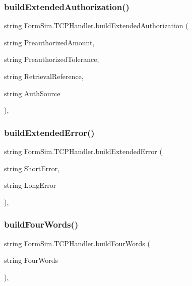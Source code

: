 \subsubsection{\texorpdfstring{build\+Extended\+Authorization()}{buildExtendedAuthorization()}}
{\footnotesize\ttfamily string Form\+Sim.\+T\+C\+P\+Handler.\+build\+Extended\+Authorization (\begin{DoxyParamCaption}\item[{string}]{Preauthorized\+Amount,  }\item[{string}]{Preauthorized\+Tolerance,  }\item[{string}]{Retrieval\+Reference,  }\item[{string}]{Auth\+Source }\end{DoxyParamCaption})\hspace{0.3cm}{\ttfamily [inline]}, {\ttfamily [private]}}

\mbox{\label{class_form_sim_1_1_t_c_p_handler_a402fdcb0d83b8508f15f996f26f9ef7e}} 
\subsubsection{\texorpdfstring{build\+Extended\+Error()}{buildExtendedError()}}
{\footnotesize\ttfamily string Form\+Sim.\+T\+C\+P\+Handler.\+build\+Extended\+Error (\begin{DoxyParamCaption}\item[{string}]{Short\+Error,  }\item[{string}]{Long\+Error }\end{DoxyParamCaption})\hspace{0.3cm}{\ttfamily [inline]}, {\ttfamily [private]}}

\mbox{\label{class_form_sim_1_1_t_c_p_handler_a7d6134b876c094553e3b9cd4788711ee}} 
\subsubsection{\texorpdfstring{build\+Four\+Words()}{buildFourWords()}}
{\footnotesize\ttfamily string Form\+Sim.\+T\+C\+P\+Handler.\+build\+Four\+Words (\begin{DoxyParamCaption}\item[{string}]{Four\+Words }\end{DoxyParamCaption})\hspace{0.3cm}{\ttfamily [inline]}, {\ttfamily [private]}}

